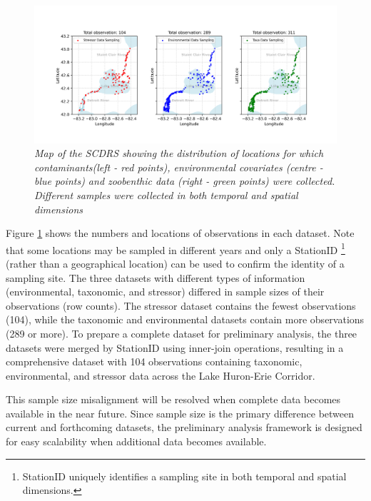 \begin{figure}[!h]
    \centering
    \includegraphics[width=1\textwidth]{../results/different_data_sampling_locations.png}
    \caption{\textit{Map of the SCDRS showing the distribution of locations for which contaminants(left - red points),
environmental covariates (centre - blue points) and zoobenthic data (right - green points) were collected.
Different samples were collected in both temporal and spatial dimensions}}
    \label{fig:different_data_sampling_locations}
\end{figure}

Figure \textcolor{blue}{\ref{fig:different_data_sampling_locations}} shows the numbers
and locations of observations in each dataset.
Note that some locations may be sampled in different
years and only a StationID
\footnote{StationID uniquely identifies a sampling site in both temporal and spatial dimensions.}
(rather than a geographical location) can be
used to confirm the identity of a sampling site.
The three datasets with different types of information (environmental, taxonomic, and stressor) differed in
sample sizes of their observations (row counts).
The stressor dataset contains the fewest observations (104), while the taxonomic and environmental datasets
contain more observations (289 or more).
To prepare a complete dataset for preliminary analysis,
the three datasets were merged by StationID using inner-join operations,
resulting in a comprehensive dataset with 104 observations containing taxonomic, 
environmental, and stressor data across the Lake Huron-Erie Corridor.

This sample size misalignment will be resolved when complete data becomes available in the near future.
Since sample size is the primary difference between current and forthcoming datasets,
the preliminary analysis framework is designed for easy scalability
when additional data becomes available.

